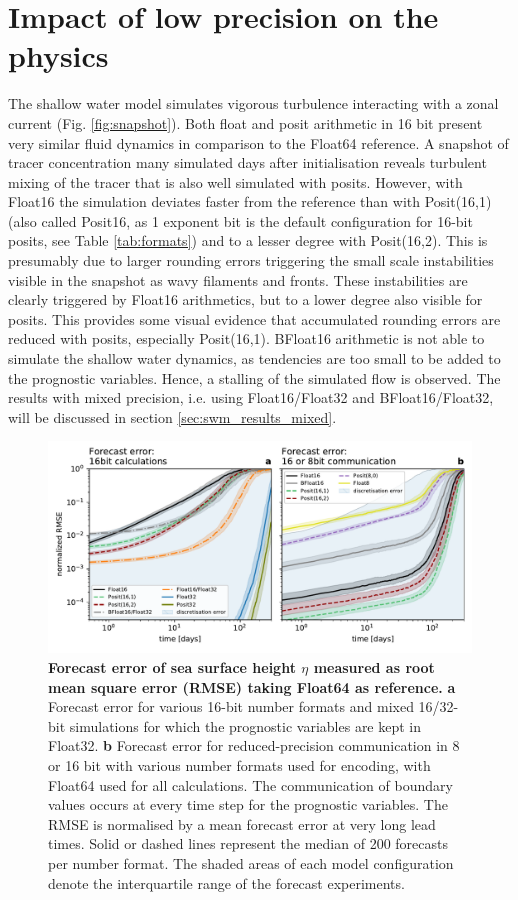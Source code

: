 \section{Impact of low precision on the physics}
\label{sec:swm_physics}

The shallow water model simulates vigorous turbulence interacting with a zonal current (Fig. \ref{fig:snapshot}). Both float and
posit arithmetic in 16 bit present very similar fluid dynamics in comparison to the Float64 reference. A snapshot of tracer
concentration many simulated days after initialisation reveals turbulent mixing of the tracer that is also well simulated with posits.
However, with Float16 the simulation deviates faster from the reference than with Posit(16,1) (also called Posit16, as 1 exponent
bit is the default configuration for 16-bit posits, see Table \ref{tab:formats}) and to a lesser degree with Posit(16,2).
This is  presumably due to larger rounding errors triggering the small scale instabilities visible in the snapshot as wavy
filaments and fronts. These instabilities are clearly triggered by Float16 arithmetics, but to a lower degree also visible for posits.
This provides some visual evidence that accumulated rounding errors are reduced with posits, especially Posit(16,1). BFloat16
arithmetic is not able to simulate the shallow water dynamics, as tendencies are too small to be added to the prognostic variables. 
Hence, a stalling of the simulated flow is observed. The results with mixed precision, i.e. using Float16/Float32 and BFloat16/Float32,
will be discussed in section \ref{sec:swm_results_mixed}.

\begin{figure}
\includegraphics[width=1\textwidth]{Figures/swm/rmse_eta_darker.pdf}
\caption{\textbf{Forecast error of sea surface height $\eta$ measured as root mean square error (RMSE) taking Float64 as reference.}
\textbf{a} Forecast error for various 16-bit number formats and mixed 16/32-bit simulations for which the prognostic variables
are kept in Float32. \textbf{b} Forecast error for reduced-precision communication in 8 or 16 bit with various number formats used
for encoding, with Float64 used for all calculations. The communication of boundary values occurs at every time step
for the prognostic variables. The RMSE is normalised by a mean forecast error at very long lead times. Solid or dashed lines represent
the median of 200 forecasts per number format. The shaded areas of each model configuration denote the interquartile
range of the forecast experiments.}
\label{fig:rmse}
\end{figure}


